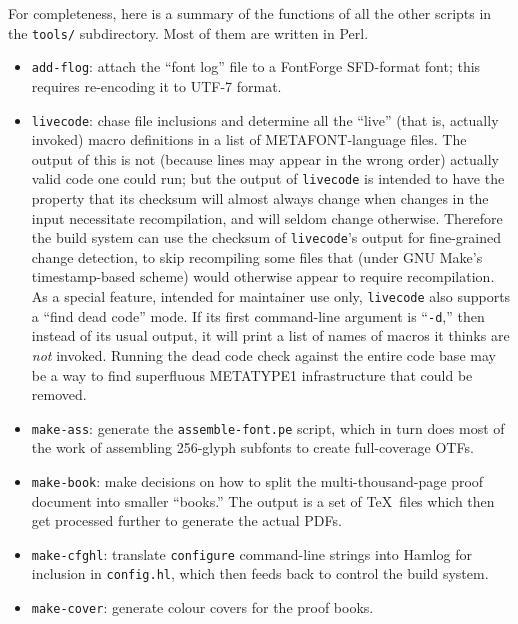 \documentclass[14pt]{extarticle}
\begin{document}
For completeness, here is a summary of the functions of all the other
scripts in the \texttt{tools/} subdirectory.  Most of them are written in
Perl.

\begin{itemize}

\item \texttt{add-flog}: attach the ``font log'' file to a FontForge
SFD-format font; this requires re-encoding it to UTF-7 format.

\item \texttt{livecode}: chase file inclusions and determine all the
``live'' (that is, actually invoked) macro definitions in a list of
METAFONT-language files.  The output of this is not (because lines may
appear in the wrong order) actually valid code one could run; but the output
of \texttt{livecode} is intended to have the property that its checksum will
almost always change when changes in the input necessitate recompilation,
and will seldom change otherwise.  Therefore the build system can use the
checksum of \texttt{livecode}'s output for fine-grained change detection, to
skip recompiling some files that (under GNU Make's timestamp-based scheme)
would otherwise appear to require recompilation.  As a special feature,
intended for maintainer use only, \texttt{livecode} also supports a ``find
dead code'' mode.  If its first command-line argument is ``\texttt{-d},''
then instead of its usual output, it will print a list of names of macros it
thinks are \emph{not} invoked.  Running the dead code check against the
entire code base may be a way to find superfluous METATYPE1 infrastructure
that could be removed.

\item \texttt{make-ass}: generate the \texttt{assemble-font.pe} script,
which in turn does most of the work of assembling 256-glyph subfonts to
create full-coverage OTFs.

\item \texttt{make-book}: make decisions on how to split the
multi-thousand-page proof document into smaller ``books.''  The output
is a set of \TeX\ files which then get processed further to generate the
actual PDFs.

\item \texttt{make-cfghl}: translate \texttt{configure} command-line strings
into Hamlog for inclusion in \texttt{config.hl}, which then feeds back to
control the build system.

\item \texttt{make-cover}: generate colour covers for the proof books.


\end{itemize}
\end{document}
